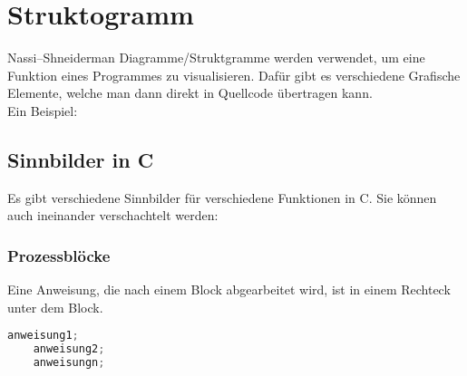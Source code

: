 \section{Struktogramm}

Nassi–Shneiderman Diagramme/Struktgramme werden verwendet, um eine Funktion eines Programmes zu visualisieren. Dafür gibt es verschiedene Grafische Elemente, welche man dann direkt in Quellcode übertragen kann.\\
Ein Beispiel:\\

\begin{center}
\end{center}


\subsection{Sinnbilder in C}

Es gibt verschiedene Sinnbilder für verschiedene Funktionen in C. Sie können auch ineinander verschachtelt werden:

\subsubsection{Prozessblöcke}

Eine Anweisung, die nach einem Block abgearbeitet wird, ist in einem Rechteck unter dem Block. \\

\noindent
\begin{minipage}[c]{0.45\columnwidth}
    \begin{center}
    \end{center}
\end{minipage}
\begin{minipage}[c]{0.45\columnwidth} 
\begin{lstlisting}[language = c]
    anweisung1;
    anweisung2;
    anweisungn;
\end{lstlisting}
\end{minipage}

